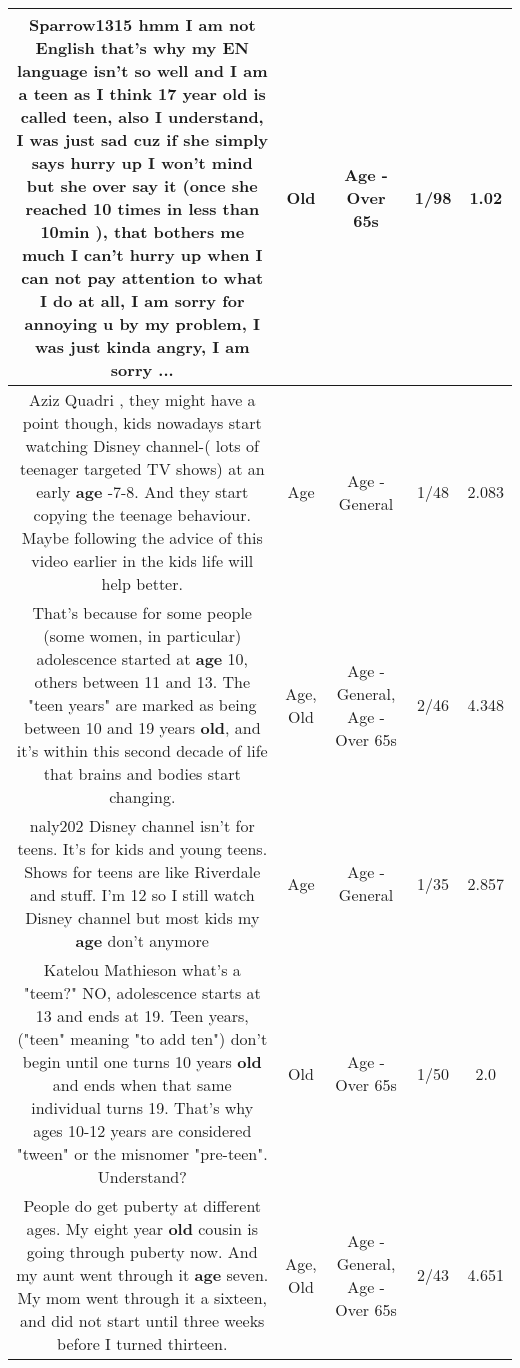 \documentclass[11pt]{article}
\newlength\mylength
\begin{document}
\begin{center}
\begin{longtable}{|C{.65\mylength}|C{.30\mylength}|C{.12\mylength}|C{.12\mylength}|C{.12\mylength}|}
  \small Sparrow1315 hmm I am not English that's why my EN language isn't so well and I am a teen as I think 17 year \textbf{old} is called teen, also I understand, I was just sad cuz if she simply says hurry up I won't mind but she over say it (once she reached 10 times in less than 10min ),  that bothers me much I can't hurry up when I can not pay attention to what I do at all, I am sorry for annoying u by my problem, I was just kinda angry, I am sorry ...\normalsize   & Old & Age - Over 65s & 1/98 & 1.02 \\  \hline
  \small Aziz Quadri , they might have a point though, kids nowadays start watching Disney channel-( lots of teenager targeted TV shows) at an early \textbf{age} -7-8. And they start copying the teenage behaviour. Maybe following the advice of this video earlier in the kids life will help better.\normalsize   & Age & Age - General & 1/48 & 2.083 \\  \hline
  \small That's because for some people (some women, in particular) adolescence started at \textbf{age} 10, others between 11 and 13. The "teen years" are marked as being between 10 and 19 years \textbf{old}, and it's within this second decade of life that brains and bodies start changing.\normalsize   & Age, Old & Age - General, Age - Over 65s & 2/46 & 4.348 \\  \hline
  \small naly202 Disney channel isn't for teens. It's for kids and young teens. Shows for teens are like Riverdale and stuff. I'm 12 so I still watch Disney channel but most kids my \textbf{age} don't anymore\normalsize   & Age & Age - General & 1/35 & 2.857 \\  \hline
  \small Katelou Mathieson what's a "teem?" NO, adolescence starts at 13 and ends at 19. Teen years, ("teen" meaning "to add ten") don't begin until one turns 10 years \textbf{old} and ends when that same individual turns 19. That's why ages 10-12 years are considered "tween" or the misnomer "pre-teen". Understand?\normalsize   & Old & Age - Over 65s & 1/50 & 2.0 \\  \hline
  \small People do get puberty at different ages. My eight year \textbf{old} cousin is going through puberty now. And my aunt went through it \textbf{age} seven. My mom went through it a sixteen, and did not start until three weeks before I turned thirteen.\normalsize   & Age, Old & Age - General, Age - Over 65s & 2/43 & 4.651 \\  \hline

\end{longtable}
\end{center}
\end{document}
